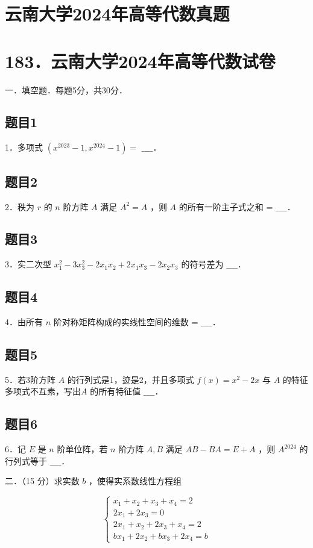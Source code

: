 \documentclass{article}
\begin{document}
\section*{云南大学2024年高等代数真题}
\section*{183．云南大学2024年高等代数试卷}
一．填空题．每题5分，共30分．\\

\subsection{题目1}
1．多项式 \(\left(x^{2023}-1, x^{2024}-1\right)=\) \(\_\_\_\_\)．

\subsection{题目2}
2．秩为 \(r\) 的 \(n\) 阶方阵 \(A\) 满足 \(A^{2}=A\) ，则 \(A\) 的所有一阶主子式之和 = \(\_\_\_\_\)．

\subsection{题目3}
3．实二次型 \(x_{1}^{2}-3 x_{3}^{2}-2 x_{1} x_{2}+2 x_{1} x_{3}-2 x_{2} x_{3}\) 的符号差为 \(\_\_\_\_\)．

\subsection{题目4}
4．由所有 \(n\) 阶对称矩阵构成的实线性空间的维数 = \(\_\_\_\_\)．

\subsection{题目5}
5．若3阶方阵 \(A\) 的行列式是1，迹是2，并且多项式 \(f(x)=x^{2}-2 x\) 与 \(A\) 的特征多项式不互素，写出\(A\) 的所有特征值 \(\_\_\_\_\)．

\subsection{题目6}
6．记 \(E\) 是 \(n\) 阶单位阵，若 \(n\) 阶方阵 \(A, B\) 满足 \(A B-B A=E+A\) ，则 \(A^{2024}\) 的行列式等于 \(\_\_\_\_\)．

二．（15 分）求实数 \(b\) ，使得实系数线性方程组

\[
\left\{\begin{array}{l}
x_{1}+x_{2}+x_{3}+x_{4}=2 \\
2 x_{1}+2 x_{3}=0 \\
2 x_{1}+x_{2}+2 x_{3}+x_{4}=2 \\
b x_{1}+2 x_{2}+b x_{3}+2 x_{4}=b
\end{array}\right.
\]
\end{document}
